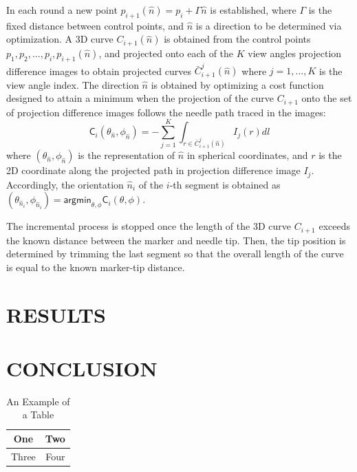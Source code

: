 \documentclass[letterpaper, 10 pt, conference]{ieeeconf}  %
\begin{document}
In each round a new point $p_{i+1}(\hat{n}) = p_i + \Gamma \hat{n}$ is established, where $\Gamma$ is the fixed distance between control points, and $\hat{n}$ is a direction to be determined via optimization. 
A 3D curve $C_{i+1}(\hat{n})$ is obtained from the control points $p_1, p_2, ..., p_i, p_{i+1}(\hat{n})$, and projected onto each of the $K$ view angles projection difference images to obtain projected curves $\bar{C}_{i+1}^j(\hat{n})$ where $j=1,...,K$ is the view angle index.
The direction $\hat{n}$ is obtained by optimizing a cost function designed to attain a minimum when the projection of the curve $C_{i+1}$ onto the set of projection difference images follows the needle path traced in the images:
\[ \textsf{C}_i(\theta_{\hat{n}}, \phi_{\hat{n}}) = -\sum_{j=1}^K{\int_{r \in \bar{C}_{i+1}^j(\hat{n})} {I_j(r)dl}} \]
where $ (\theta_{\hat{n}}, \phi_{\hat{n}}) $ is the representation of $ \hat{n} $ in spherical coordinates, and $r$ is the 2D coordinate along the projected path in projection difference image $I_j$. 
Accordingly, the orientation $\hat{n}_i$ of the $i$-th segment is obtained as $(\theta_{\hat{n}_i}, \phi_{\hat{n}_i}) = \textsf{argmin}_{\theta, \phi} \textsf{C}_i ( \theta, \phi)$.

The incremental process is stopped once the length of the 3D curve $C_{i+1}$ exceeds the known distance between the marker and needle tip. Then, the tip position is determined by trimming the last segment so that the overall length of the curve is equal to the known marker-tip distance.

\section{RESULTS}

\section{CONCLUSION}

\begin{table}[h]
\caption{An Example of a Table}
\label{table_example}
\begin{center}
\begin{tabular}{|c||c|}
\hline
One & Two\\
\hline
Three & Four\\
\hline
\end{tabular}
\end{center}
\end{table}
\end{document}
